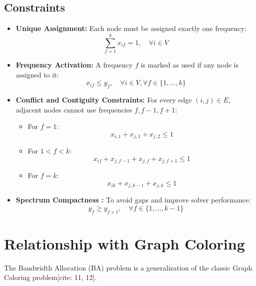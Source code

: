 \documentclass{article}
\begin{document}
\subsection{Constraints}
\begin{itemize}
    \item \textbf{Unique Assignment:} Each node must be assigned exactly one frequency:
    \begin{equation}
        \sum_{f=1}^{k} x_{if} = 1, \quad \forall i \in V
    \end{equation}

    \item \textbf{Frequency Activation:} A frequency $f$ is marked as used if any node is assigned to it:
    \begin{equation}
        x_{if} \le y_f, \quad \forall i \in V, \forall f \in \{1, \dots, k\}
    \end{equation}

    \item \textbf{Conflict and Contiguity Constraints:} For every edge $(i, j) \in E$, adjacent nodes cannot use frequencies $f, f-1, f+1$:
    \begin{itemize}
        \item For $f=1$:
        \begin{equation}
            x_{i,1} + x_{j,1} + x_{j,2} \le 1
        \end{equation}
        \item For $1 < f < k$:
        \begin{equation}
            x_{if} + x_{j,f-1} + x_{j,f} + x_{j,f+1} \le 1
        \end{equation}
        \item For $f=k$:
        \begin{equation}
            x_{ik} + x_{j,k-1} + x_{j,k} \le 1
        \end{equation}
    \end{itemize}
    
    \item \textbf{Spectrum Compactness :} To avoid gaps and improve solver performance:
    \begin{equation}
        y_f \ge y_{f+1}, \quad \forall f \in \{1, \dots, k-1\}
    \end{equation}
\end{itemize}

\section{Relationship with Graph Coloring}
The Bandwidth Allocation (BA) problem is a generalization of the classic Graph Coloring problem[cite: 11, 12]. 
\end{document}
